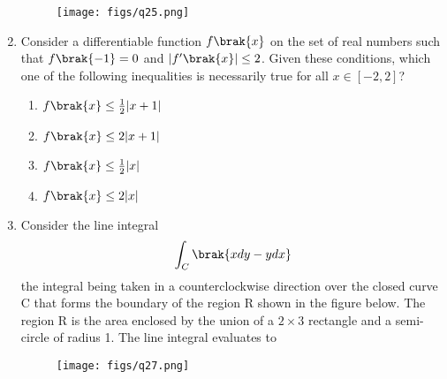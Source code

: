 \documentclass[a4paper, 11pt]{article}
\begin{document}
\begin{enumerate}
    \begin{figure}[H]
        \centering
        \texttt{[image: figs/q25.png]}
        \caption*{}
        \label{fig:q25}
    \end{figure}

    \hfill{}
    
    \item Consider a differentiable function $f\brak{x}$ on the set of real numbers such that $f\brak{-1}=0$ and $|f'\brak{x}|\le2$. Given these conditions, which one of the following inequalities is necessarily true for all $x\in[-2,2]$?
    
    \begin{enumerate}
        \item $f\brak{x}\le\frac{1}{2}|x+1|$
        \item $f\brak{x}\le2|x+1|$
        \item $f\brak{x}\le\frac{1}{2}|x|$
        \item $f\brak{x}\le2|x|$
    \end{enumerate}

    \hfill{}
    
    \item Consider the line integral
    \[
    \int_{C}\brak{xdy-ydx}
    \]
    the integral being taken in a counterclockwise direction over the closed curve C that forms the boundary of the region R shown in the figure below. The region R is the area enclosed by the union of a $2\times3$ rectangle and a semi-circle of radius 1. The line integral evaluates to
    
    \begin{figure}[H]
        \centering
        \texttt{[image: figs/q27.png]}
        \caption*{}
        \label{fig:q27}
    \end{figure}
    
    \begin{enumerate}
    \end{enumerate}

    \hfill{}
    

\end{enumerate}
\end{document}
